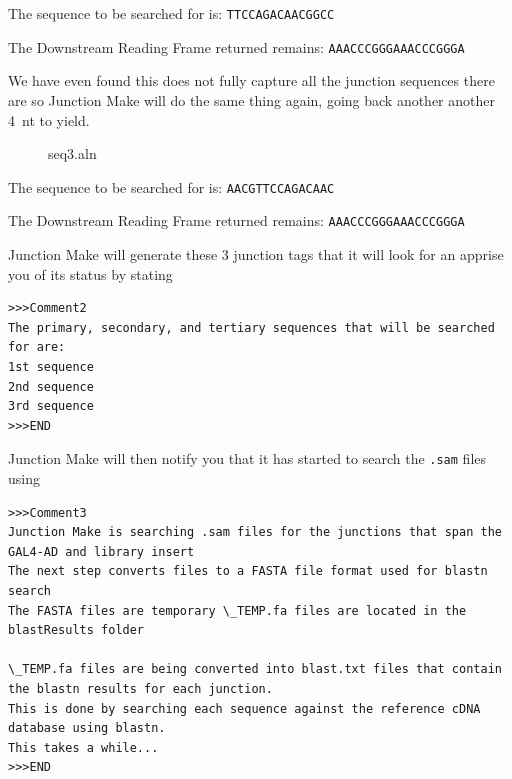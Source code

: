 \documentclass[11pt,fleqn]{book} %
\newcommand{\JunctionMake}{{\color{Blue} Junction Make }}
\begin{document}
The sequence to be searched for is: \texttt{TTCCAGACAACGGCC}

The Downstream Reading Frame returned remains: \texttt{AAACCCGGGAAACCCGGGA}

\vspace{10pt}

We have even found this does not fully capture all the junction sequences there are so \JunctionMake will do the same thing  again, going back another another 4~nt to yield.

\begin{figure}[!ht]
\centering
\begin{texshade}{seq3.aln}
	\hideconsensus
	\hidenumbering
\end{texshade}
\end{figure}

The sequence to be searched for is: \texttt{AACGTTCCAGACAAC}

The Downstream Reading Frame returned remains: \texttt{AAACCCGGGAAACCCGGGA}

\vspace{15pt}

\JunctionMake will generate these 3 junction tags that it will look for an apprise you of its status by stating 
\begin{lstlisting}
>>>Comment2
The primary, secondary, and tertiary sequences that will be searched for are:
1st sequence
2nd sequence
3rd sequence
>>>END 
\end{lstlisting}

\JunctionMake will then notify you that it has started to search the \texttt{.sam} files using 
\begin{lstlisting}
>>>Comment3
Junction Make is searching .sam files for the junctions that span the GAL4-AD and library insert
The next step converts files to a FASTA file format used for blastn search
The FASTA files are temporary \_TEMP.fa files are located in the blastResults folder

\_TEMP.fa files are being converted into blast.txt files that contain the blastn results for each junction.
This is done by searching each sequence against the reference cDNA database using blastn.
This takes a while...
>>>END
\end{lstlisting}
\end{document}
